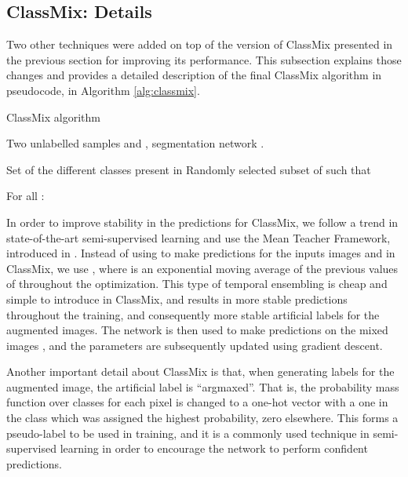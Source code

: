 \documentclass[10pt,twocolumn,letterpaper]{article}
\begin{document}
\subsection{ClassMix: Details}
Two other techniques were added on top of the version of ClassMix presented in the previous section for improving its performance. This subsection explains those changes and provides a detailed description of the final ClassMix algorithm in pseudocode, in Algorithm \ref{alg:classmix}.

\begin{algorithm}[h]
\caption{ClassMix algorithm}
\label{alg:classmix}
\begin{algorithmic}[1]
\Require Two unlabelled samples  and , segmentation network .

\State 
\State 
\State  {}
\State  Set of the different classes present in 
\State  Randomly selected subset of  such that 

\State For all :  

\State  {}
\State  {}

\State \Return 
\end{algorithmic}
\end{algorithm}

 In order to improve stability in the predictions for ClassMix, we follow a trend in state-of-the-art semi-supervised learning \cite{French,berthelot2019mixmatch,ict} and use the Mean Teacher Framework, introduced in \cite{TarvainenMeanTeacher}. Instead of using  to make predictions for the inputs images  and  in ClassMix, we use , where  is an exponential moving average of the previous values of  throughout the optimization. This type of temporal ensembling is cheap and simple to introduce in ClassMix, and results in more stable predictions throughout the training, and consequently more stable artificial labels for the augmented images. The network  is then used to make predictions on the mixed images , and the parameters  are subsequently updated using gradient descent.

\vspace{0.4cm}
Another important detail about ClassMix is that, when generating labels for the augmented image, the artificial label  is ``argmaxed''. That is, the probability mass function over classes for each pixel is changed to a one-hot vector with a one in the class which was assigned the highest probability, zero elsewhere. This forms a pseudo-label to be used in training, and it is a commonly used technique in semi-supervised learning in order to encourage the network to perform confident predictions.
\end{document}

